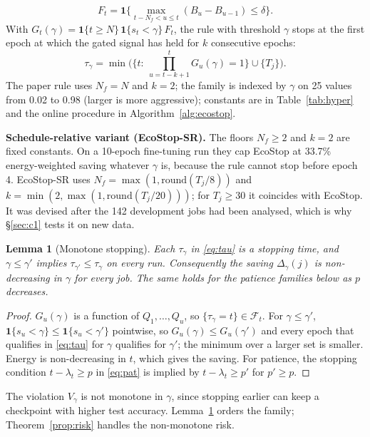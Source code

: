 \documentclass[3p,twocolumn,10pt]{elsarticle}
\newtheorem{lemma}{Lemma}
\theoremstyle{definition}
\begin{document}
\begin{equation}
F_t=\mathbf{1}\Big\{\max_{t-N_f<u\le t}(B_u-B_{u-1})\le\delta\Big\}.
\label{eq:flat}
\end{equation}
With $G_t(\gamma)=\mathbf{1}\{t\ge N\}\,\mathbf{1}\{s_t<\gamma\}\,F_t$, the rule with threshold $\gamma$ stops at the first epoch at which the gated signal has held for $k$ consecutive epochs:
\begin{equation}
\tau_\gamma=\min\Big(\Big\{t:\ \textstyle\prod_{u=t-k+1}^{t}G_u(\gamma)=1\Big\}\cup\{T_j\}\Big).
\label{eq:tau}
\end{equation}
The paper rule uses $N_f=N$ and $k=2$; the family is indexed by $\gamma$ on 25 values from 0.02 to 0.98 (larger is more aggressive); constants are in Table~\ref{tab:hyper} and the online procedure in Algorithm~\ref{alg:ecostop}.

\textbf{Schedule-relative variant (EcoStop-SR).} The floors $N_f\ge2$ and $k=2$ are fixed constants. On a 10-epoch fine-tuning run they cap EcoStop at 33.7\% energy-weighted saving whatever $\gamma$ is, because the rule cannot stop before epoch 4. EcoStop-SR uses $N_f=\max(1,\mathrm{round}(T_j/8))$ and $k=\min(2,\max(1,\mathrm{round}(T_j/20)))$; for $T_j\ge30$ it coincides with EcoStop. It was devised after the 142 development jobs had been analysed, which is why \S\ref{sec:c1} tests it on new data.

\begin{lemma}[Monotone stopping]
\label{lem:monotone}
Each $\tau_\gamma$ in \eqref{eq:tau} is a stopping time, and $\gamma\le\gamma'$ implies $\tau_{\gamma'}\le\tau_\gamma$ on every run. Consequently the saving $\Delta_\gamma(j)$ is non-decreasing in $\gamma$ for every job. The same holds for the patience families below as $p$ decreases.
\end{lemma}
\begin{proof}
$G_u(\gamma)$ is a function of $Q_1,\dots,Q_u$, so $\{\tau_\gamma=t\}\in\mathcal{F}_t$. For $\gamma\le\gamma'$, $\mathbf{1}\{s_u<\gamma\}\le\mathbf{1}\{s_u<\gamma'\}$ pointwise, so $G_u(\gamma)\le G_u(\gamma')$ and every epoch that qualifies in \eqref{eq:tau} for $\gamma$ qualifies for $\gamma'$; the minimum over a larger set is smaller. Energy is non-decreasing in $t$, which gives the saving. For patience, the stopping condition $t-\lambda_t\ge p$ in \eqref{eq:pat} is implied by $t-\lambda_t\ge p'$ for $p'\ge p$.
\end{proof}

\noindent The violation $V_\gamma$ is not monotone in $\gamma$, since stopping earlier can keep a checkpoint with higher test accuracy. Lemma~\ref{lem:monotone} orders the family; Theorem~\ref{prop:risk} handles the non-monotone risk.
\end{document}
